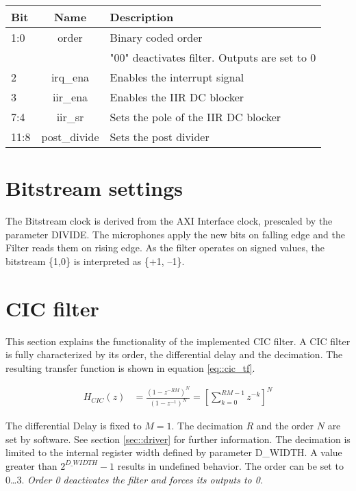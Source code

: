 \begin{table}[h]
	\centering
	\label{tbl::status_register}
	\begin{tabular}{|l|c|l|}
		\hline 
		Bit		& Name 	& Description \\
		\hline 
		1:0		& order	& Binary coded order \\
				& 		& "00" deactivates filter. Outputs are set to 0 \\
		\hline 
		2 		& irq\_ena	& Enables the interrupt signal\\
		\hline 
		3		& iir\_ena	& Enables the IIR DC blocker \\
		\hline 
		7:4		& iir\_sr	& Sets the pole of the IIR DC blocker \\
		\hline 
		11:8	& post\_divide & Sets the post divider \\
		\hline 
	\end{tabular} 
\end{table}

\section{Bitstream settings}
\label{sec::bitstream}
The Bitstream clock is derived from the AXI Interface clock, prescaled by the parameter DIVIDE.
The microphones apply the new bits on falling edge and the Filter reads them on rising edge.
As the filter operates on signed values, the bitstream \{1,0\} is interpreted as \{+1, --1\}.

\section{CIC filter}
\label{sec::cic}

This section explains the functionality of the implemented CIC filter.
A CIC filter is fully characterized by its order, the differential delay and the decimation.
The resulting transfer function is shown in equation \ref{eq::cic_tf}.

\begin{align}
	H_{CIC}(z) &= \frac{\left(1-z^{-RM}\right)^N}{\left(1-z^{-1}\right)^N} = \left[\sum_{k=0}^{RM-1}z^{-k}\right]^N\label{eq::cic_tf}
\end{align}

The differential Delay is fixed to $M=1$.
The decimation $R$ and the order $N$ are set by software.
See section \ref{sec::driver} for further information.
The decimation is limited to the internal register width defined by parameter D\_WIDTH.
A value greater than $2^{D\_WIDTH} - 1$ results in undefined behavior.
The order can be set to 0\ldots3.
\emph{Order 0 deactivates the filter and forces its outputs to 0.}

